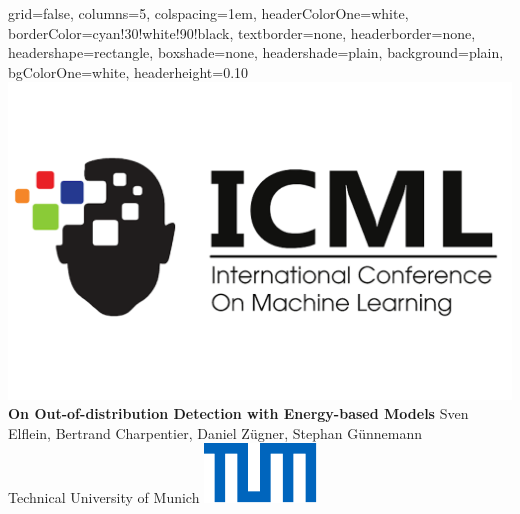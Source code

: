 \documentclass[landscape,a0paper,fontscale=0.292]{baposter}
\begin{document}
\begin{poster}{
 grid=false,
 columns=5,
 colspacing=1em,
 headerColorOne=white,
 borderColor=cyan!30!white!90!black,
 textborder=none,
 headerborder=none,
 headershape=rectangle,
 boxshade=none,
 headershade=plain,
 background=plain,
 bgColorOne=white,
 headerheight=0.10\textheight}
 {
      \includegraphics[width=0.15\linewidth]{tables/icml_logo.png}
 }
 {\huge\bf On Out-of-distribution Detection with Energy-based Models}
 {\vspace{0.3em} Sven Elflein, Bertrand Charpentier, Daniel Z\"ugner, Stephan G\"unnemann \\
 Technical University of Munich}
 {
      \includegraphics[width=0.08\linewidth]{Universitaet_Logo_RGB.pdf}
      \makebox[0.04\textwidth]{} 
 }


\end{poster}
\end{document}
